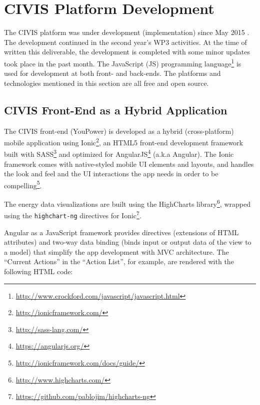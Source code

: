 \section{CIVIS Platform  Development} 
 
The CIVIS platform was under development (implementation) since May 2015 \citep{Huang2015c}. The development continued in the second year's WP3 activities. At the time of written this deliverable, the development is completed with some minor updates took place in the past month.
% 
The JavaScript (JS) programming language\footnote{\url{http://www.crockford.com/javascript/javascript.html}} is used for development at both front- and back-ends. 
The platforms and technologies mentioned in this section are all free and open source. 

\subsection{CIVIS Front-End as a Hybrid Application} 

The CIVIS front-end (YouPower) is developed as a hybrid (cross-platform) mobile application using Ionic\footnote{\url{http://ionicframework.com/}}, an HTML5 front-end development framework built with SASS\footnote{\url{http://sass-lang.com/}} and optimized for AngularJS\footnote{\url{https://angularjs.org/}} (a.k.a Angular). 
% 
The Ionic framework comes with native-styled mobile UI elements and layouts, and handles the look and feel and the UI interactions the app needs in order to be compelling\footnote{\url{http://ionicframework.com/docs/guide/}}. 
% 

The energy data visualizations are built using the HighCharts library\footnote{\url{http://www.highcharts.com/}}, wrapped using the {\tt highchart-ng} directives for Ionic\footnote{\url{https://github.com/pablojim/highcharts-ng}}.



Angular as a JavaScript framework provides directives (extensions of HTML attributes) and two-way data binding (binds input or output data of the view to a model) that simplify the app development with MVC architecture. The ``Current Actions'' in the ``Action List'', for example, are rendered with the following HTML code: 

